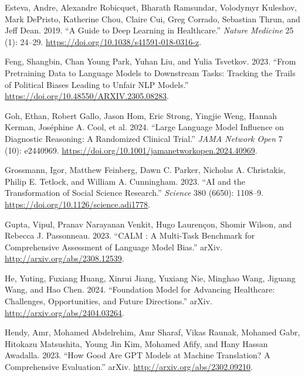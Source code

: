 \documentclass[
  Letterpaper,
]{scrbook}
\newlength{\cslhangindent}
\newenvironment{CSLReferences}[2] %
 {\begin{list}{}{%
  \setlength{\itemindent}{0pt}
  \setlength{\leftmargin}{0pt}
  \setlength{\parsep}{0pt}
  \ifodd #1
   \setlength{\leftmargin}{\cslhangindent}
   \setlength{\itemindent}{-1\cslhangindent}
  \fi
  \setlength{\itemsep}{#2\baselineskip}}}
 {\end{list}}
\begin{document}
\begin{CSLReferences}{1}{0}
Esteva, Andre, Alexandre Robicquet, Bharath Ramsundar, Volodymyr
Kuleshov, Mark DePristo, Katherine Chou, Claire Cui, Greg Corrado,
Sebastian Thrun, and Jeff Dean. 2019. {``A Guide to Deep Learning in
Healthcare.''} \emph{Nature Medicine} 25 (1): 24--29.
\url{https://doi.org/10.1038/s41591-018-0316-z}.

Feng, Shangbin, Chan Young Park, Yuhan Liu, and Yulia Tsvetkov. 2023.
{``From {Pretraining} {Data} to {Language} {Models} to {Downstream}
{Tasks}: {Tracking} the {Trails} of {Political} {Biases} {Leading} to
{Unfair} {NLP} {Models}.''}
\url{https://doi.org/10.48550/ARXIV.2305.08283}.

Goh, Ethan, Robert Gallo, Jason Hom, Eric Strong, Yingjie Weng, Hannah
Kerman, Joséphine A. Cool, et al. 2024. {``Large {Language} {Model}
{Influence} on {Diagnostic} {Reasoning}: {A} {Randomized} {Clinical}
{Trial}.''} \emph{JAMA Network Open} 7 (10): e2440969.
\url{https://doi.org/10.1001/jamanetworkopen.2024.40969}.

Grossmann, Igor, Matthew Feinberg, Dawn C. Parker, Nicholas A.
Christakis, Philip E. Tetlock, and William A. Cunningham. 2023. {``{AI}
and the Transformation of Social Science Research.''} \emph{Science} 380
(6650): 1108--9. \url{https://doi.org/10.1126/science.adi1778}.

Gupta, Vipul, Pranav Narayanan Venkit, Hugo Laurençon, Shomir Wilson,
and Rebecca J. Passonneau. 2023. {``{CALM} : {A} {Multi}-Task
{Benchmark} for {Comprehensive} {Assessment} of {Language} {Model}
{Bias}.''} arXiv. \url{http://arxiv.org/abs/2308.12539}.

He, Yuting, Fuxiang Huang, Xinrui Jiang, Yuxiang Nie, Minghao Wang,
Jiguang Wang, and Hao Chen. 2024. {``Foundation {Model} for {Advancing}
{Healthcare}: {Challenges}, {Opportunities}, and {Future}
{Directions}.''} arXiv. \url{http://arxiv.org/abs/2404.03264}.

Hendy, Amr, Mohamed Abdelrehim, Amr Sharaf, Vikas Raunak, Mohamed Gabr,
Hitokazu Matsushita, Young Jin Kim, Mohamed Afify, and Hany Hassan
Awadalla. 2023. {``How {Good} {Are} {GPT} {Models} at {Machine}
{Translation}? {A} {Comprehensive} {Evaluation}.''} arXiv.
\url{http://arxiv.org/abs/2302.09210}.


\end{CSLReferences}
\end{document}
